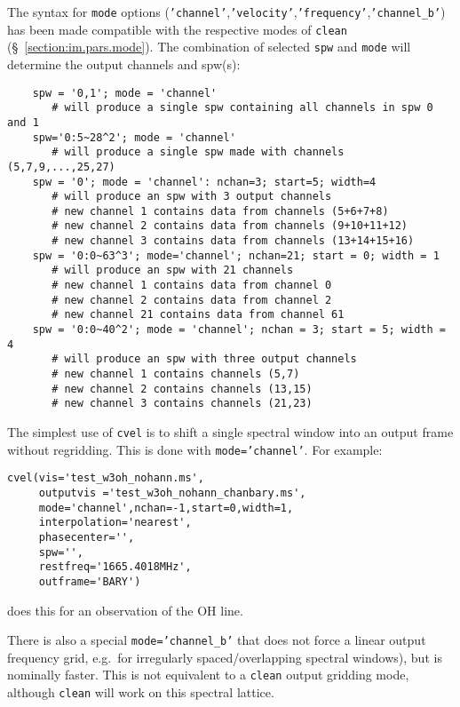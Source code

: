 The syntax for {\tt mode} options 
({\tt 'channel'},{\tt 'velocity'},{\tt 'frequency'},{\tt 'channel\_b'})
has been made compatible with the
respective modes of {\tt clean} (\S~\ref{section:im.pars.mode}).  The
combination of selected {\tt spw} and {\tt mode} will determine the
output channels and spw(s):
\small
\begin{verbatim}
    spw = '0,1'; mode = 'channel'
       # will produce a single spw containing all channels in spw 0 and 1
    spw='0:5~28^2'; mode = 'channel'
       # will produce a single spw made with channels (5,7,9,...,25,27)
    spw = '0'; mode = 'channel': nchan=3; start=5; width=4
       # will produce an spw with 3 output channels
       # new channel 1 contains data from channels (5+6+7+8)
       # new channel 2 contains data from channels (9+10+11+12)
       # new channel 3 contains data from channels (13+14+15+16)
    spw = '0:0~63^3'; mode='channel'; nchan=21; start = 0; width = 1
       # will produce an spw with 21 channels
       # new channel 1 contains data from channel 0
       # new channel 2 contains data from channel 2
       # new channel 21 contains data from channel 61
    spw = '0:0~40^2'; mode = 'channel'; nchan = 3; start = 5; width = 4
       # will produce an spw with three output channels
       # new channel 1 contains channels (5,7)
       # new channel 2 contains channels (13,15)
       # new channel 3 contains channels (21,23)
\end{verbatim}
\normalsize

The simplest use of {\tt cvel} is to shift a single spectral window
into an output frame without regridding.  This is done with 
{\tt mode='channel'}.  For example:
\small
\begin{verbatim}
cvel(vis='test_w3oh_nohann.ms',
     outputvis ='test_w3oh_nohann_chanbary.ms',
     mode='channel',nchan=-1,start=0,width=1,
     interpolation='nearest',
     phasecenter='',
     spw='',
     restfreq='1665.4018MHz',
     outframe='BARY')
\end{verbatim}
\normalsize
does this for an observation of the OH line.

There is also a special {\tt mode='channel\_b'} that does not force a
linear output frequency grid, e.g.\ for irregularly spaced/overlapping
spectral windows), but is nominally faster.  This is not equivalent to
a {\tt clean} output gridding mode, although {\tt clean} will
work on this spectral lattice.

